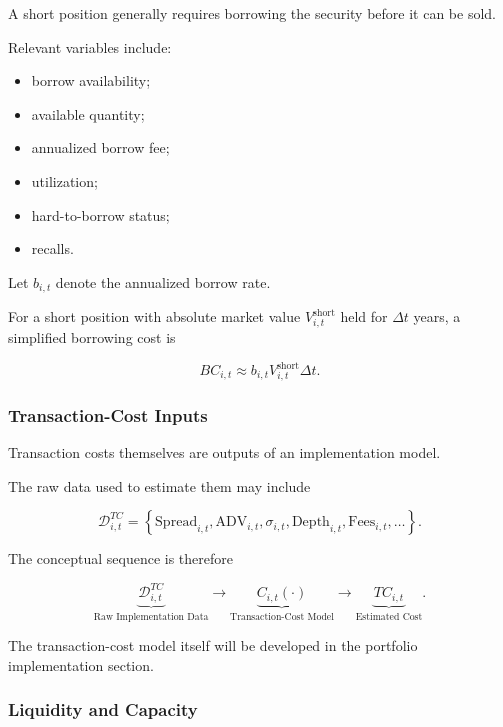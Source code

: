 \documentclass[11pt,a4paper]{article}
\begin{document}
A short position generally requires borrowing the security before it can be
sold.

Relevant variables include:

\begin{itemize}
    \item borrow availability;
    \item available quantity;
    \item annualized borrow fee;
    \item utilization;
    \item hard-to-borrow status;
    \item recalls.
\end{itemize}

Let $b_{i,t}$ denote the annualized borrow rate.

For a short position with absolute market value
$V_{i,t}^{\mathrm{short}}$ held for $\Delta t$ years, a simplified borrowing
cost is

\begin{equation}
\boxed{
BC_{i,t}
\approx
b_{i,t}
V_{i,t}^{\mathrm{short}}
\Delta t.
}
\end{equation}


\subsubsection{Transaction-Cost Inputs}

Transaction costs themselves are outputs of an implementation model.

The raw data used to estimate them may include

\begin{equation}
\mathcal{D}_{i,t}^{TC}
=
\left\{
\mathrm{Spread}_{i,t},
\mathrm{ADV}_{i,t},
\sigma_{i,t},
\mathrm{Depth}_{i,t},
\mathrm{Fees}_{i,t},
\ldots
\right\}.
\end{equation}

The conceptual sequence is therefore

\begin{equation}
\boxed{
\underbrace{
\mathcal{D}_{i,t}^{TC}
}_{\text{Raw Implementation Data}}
\longrightarrow
\underbrace{
C_{i,t}(\cdot)
}_{\text{Transaction-Cost Model}}
\longrightarrow
\underbrace{
TC_{i,t}
}_{\text{Estimated Cost}}.
}
\end{equation}

The transaction-cost model itself will be developed in the portfolio
implementation section.


\subsubsection{Liquidity and Capacity}
\end{document}
